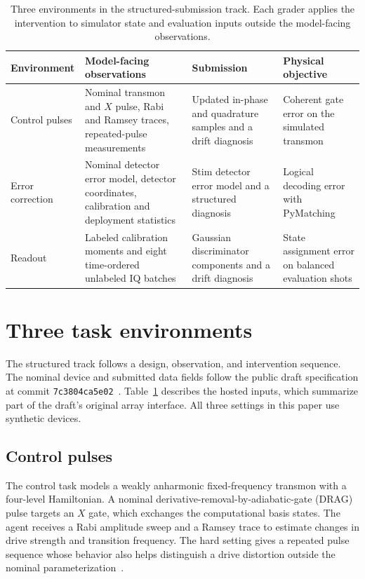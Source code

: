 \documentclass{article}
\begin{document}
\begin{table}[t]
\centering\small
\caption{Three environments in the structured-submission track. Each grader applies the intervention to simulator state and evaluation inputs outside the model-facing observations.}
\label{tab:environments}
\begin{tabularx}{\textwidth}{@{}lXXX@{}}
\toprule
Environment & Model-facing observations & Submission & Physical objective \\
\midrule
Control pulses & Nominal transmon and $X$ pulse, Rabi and Ramsey traces, repeated-pulse measurements & Updated in-phase and quadrature samples and a drift diagnosis & Coherent gate error on the simulated transmon \\
Error correction & Nominal detector error model, detector coordinates, calibration and deployment statistics & Stim detector error model and a structured diagnosis & Logical decoding error with PyMatching \\
Readout & Labeled calibration moments and eight time-ordered unlabeled IQ batches & Gaussian discriminator components and a drift diagnosis & State assignment error on balanced evaluation shots \\
\bottomrule
\end{tabularx}
\end{table}

\section{Three task environments}
The structured track follows a design, observation, and intervention sequence. The nominal device and submitted data fields follow the public draft specification at commit \texttt{7c3804ca5e02}~\citep{draftbench}. Table~\ref{tab:environments} describes the hosted inputs, which summarize part of the draft's original array interface. All three settings in this paper use synthetic devices.

\subsection{Control pulses}
The control task models a weakly anharmonic fixed-frequency transmon with a four-level Hamiltonian. A nominal derivative-removal-by-adiabatic-gate (DRAG) pulse targets an $X$ gate, which exchanges the computational basis states. The agent receives a Rabi amplitude sweep and a Ramsey trace to estimate changes in drive strength and transition frequency. The hard setting gives a repeated pulse sequence whose behavior also helps distinguish a drive distortion outside the nominal parameterization~\citep{koch,motzoi,draftbench}.
\end{document}
